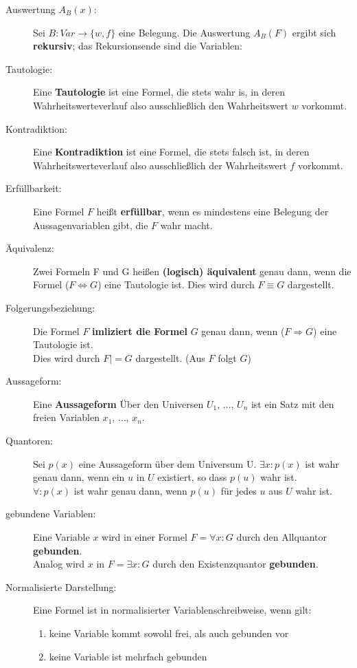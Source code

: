 \begin{description}
  \item [Auswertung $A_{B}(x)$:] 
    Sei $B : Var \to \{w,f\}$ eine Belegung. Die Auswertung $A_{B}(F)$ 
    ergibt sich \textbf{rekursiv}; das Rekursionsende sind die Variablen:
  
  \item [Tautologie:] 
    Eine \textbf{Tautologie} ist eine Formel, die stets wahr is, in deren 
    Wahrheitswerteverlauf also ausschließlich den Wahrheitswert $w$ 
    vorkommt.
  
  \item [Kontradiktion:] 
    Eine \textbf{Kontradiktion} ist eine Formel, die stets falsch ist, in deren 
    Wahrheitswerteverlauf also ausschließlich der Wahrheitswert $f$ vorkommt.
  
  \item [Erfüllbarkeit:] 
    Eine Formel $F$ heißt \textbf{erfüllbar}, wenn es mindestens eine 
    Belegung der Aussagenvariablen gibt, die $F$ wahr macht.
  
  \item [Äquivalenz:] 
    Zwei Formeln F und G heißen \textbf{(logisch) äquivalent} genau dann, wenn 
    die Formel ($F \iff G$) eine Tautologie ist. Dies wird durch 
    $F \equiv G$ dargestellt.
  
  \item [Folgerungsbeziehung:] 
    Die Formel $F$ \textbf{imliziert die Formel} $G$ genau dann, 
    wenn ($F \Rightarrow G$) eine Tautologie ist. \\
    Dies wird durch $F |= G$ dargestellt. (Aus $F$ folgt $G$)
  
  \item [Aussageform:] 
    Eine \textbf{Aussageform} Über den Universen $U_{1}$, $\dots$, $U_{n}$ 
    ist ein Satz mit den freien Variablen $x_{1}$, $\dots$, $x_{n}$.

  \item [Quantoren:] 
    Sei $p(x)$ eine Aussageform über dem Universum U. 
    $\exists x : p(x)$ ist wahr genau dann, wenn ein $u$ in 
    $U$ existiert, so dass	$p(u)$ wahr ist. \\
    $\forall : p(x)$ ist wahr genau dann, wenn $p(u)$ für jedes 
    $u$ aus $U$ wahr ist.
  
  \item [gebundene Variablen:] 
    Eine Variable $x$ wird in einer Formel 
    $F = \forall x : G$ durch den Allquantor 
    \textbf{gebunden}.\\
    Analog wird $x$ in $F = \exists x : G$ 
    durch den Existenzquantor \textbf{gebunden}.
  
  \item [Normalisierte Darstellung:] 
    Eine Formel ist in normalisierter Variablenschreibweise, wenn gilt:
    \vspace{-.5cm}
    \begin{enumerate}
      \setlength{\itemsep}{-0cm}
      \item keine Variable kommt sowohl frei, als auch gebunden vor
      \item keine Variable ist mehrfach gebunden
    \end{enumerate}
\end{description}


